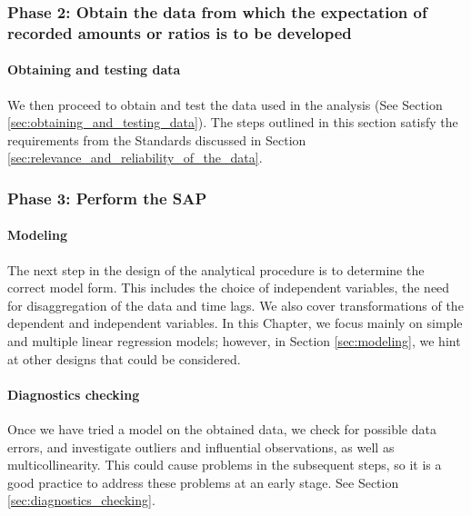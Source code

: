 \subsubsection{Phase 2: Obtain the data from which the expectation of recorded amounts or ratios is to be developed}
\paragraph{Obtaining and testing data} %
\label{par:obtaining_and_testing_data}

We then proceed to obtain and test the data used in the analysis (See Section \ref{sec:obtaining_and_testing_data}). The steps outlined in this section satisfy the requirements from the Standards discussed in Section \ref{sec:relevance_and_reliability_of_the_data}.


\subsubsection{Phase 3: Perform the SAP}

\paragraph{Modeling} %
\label{par:modeling}

The next step in the design of the analytical procedure is to determine the correct model form. This includes the choice of independent variables, the need for disaggregation of the data and time lags. We also cover transformations of the dependent and independent variables. In this Chapter, we focus mainly on simple and multiple linear regression models; however, in Section \ref{sec:modeling}, we hint at other designs that could be considered. 


\paragraph{Diagnostics checking} %
\label{par:diagnostics_checking}

Once we have tried a model on the obtained data, we check for possible data errors, and investigate outliers and influential observations, as well as multicollinearity. This could cause problems in the subsequent steps, so it is a good practice to address these problems at an early stage. See Section \ref{sec:diagnostics_checking}.

